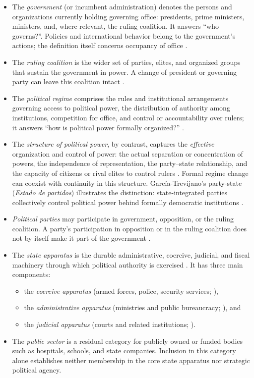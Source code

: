 \documentclass[11pt]{article}
\begin{document}
\begin{itemize}
	\item The \emph{government} (or incumbent administration) denotes the persons and organizations currently holding governing office: presidents, prime ministers, ministers, and, where relevant, the ruling coalition. It answers ``who governs?''. Policies and international behavior belong to the government's actions; the definition itself concerns occupancy of office \parencite{linz_stepan_1996}.
	\item The \emph{ruling coalition} is the wider set of parties, elites, and organized groups that sustain the government in power. A change of president or governing party can leave this coalition intact \parencite{bueno_de_mesquita_2003}.
	\item The \emph{political regime} comprises the rules and institutional arrangements governing access to political power, the distribution of authority among institutions, competition for office, and control or accountability over rulers; it answers ``how is political power formally organized?'' \parencite{linz_stepan_1996,linz_2000}.
	\item The \emph{structure of political power}, by contrast, captures the \emph{effective} organization and control of power: the actual separation or concentration of powers, the independence of representation, the party--state relationship, and the capacity of citizens or rival elites to control rulers \parencite{garciatrevijano2010}. Formal regime change can coexist with continuity in this structure. Garc{\'i}a-Trevijano's party-state (\emph{Estado de partidos}) illustrates the distinction: state-integrated parties collectively control political power behind formally democratic institutions \parencite{garciatrevijano2010}.
	\item \emph{Political parties} may participate in government, opposition, or the ruling coalition. A party's participation in opposition or in the ruling coalition does not by itself make it part of the government \parencite{sartori_1976}.
	\item The \emph{state apparatus} is the durable administrative, coercive, judicial, and fiscal machinery through which political authority is exercised \parencite{weber1922wirtschaft,althusser_1971}. It has three main components:
	\begin{itemize}
		\item the \emph{coercive apparatus} (armed forces, police, security services; \textcite{tilly_1990,althusser_1971}),
		\item the \emph{administrative apparatus} (ministries and public bureaucracy; \textcite{weber1922wirtschaft}), and
		\item the \emph{judicial apparatus} (courts and related institutions; \textcite{weber1922wirtschaft,garciatrevijano2010}).
	\end{itemize}
	\item The \emph{public sector} is a residual category for publicly owned or funded bodies such as hospitals, schools, and state companies. Inclusion in this category alone establishes neither membership in the core state apparatus nor strategic political agency.
\end{itemize}
\end{document}
